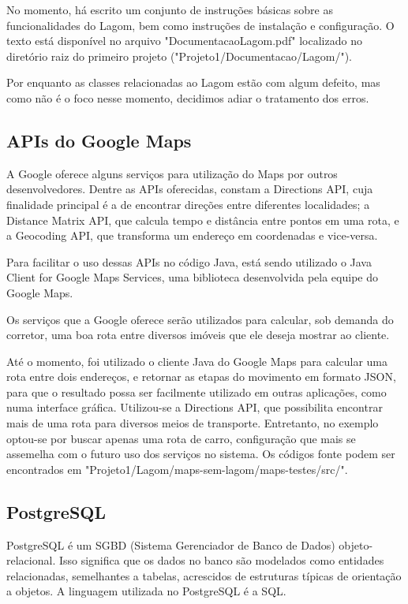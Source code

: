 \documentclass[a4paper,11pt,fleqn]{article}
\begin{document}
No momento, há escrito um conjunto de instruções básicas sobre as funcionalidades do Lagom, bem como instruções de instalação e configuração.
 O texto está disponível no arquivo "DocumentacaoLagom.pdf" localizado no diretório raiz do primeiro projeto ("Projeto1/Documentacao/Lagom/").

Por enquanto as classes relacionadas ao Lagom estão com algum defeito, mas como não é o foco nesse momento, decidimos adiar o tratamento dos erros.

\subsection{APIs do Google Maps}
\label{ss:maps}

A Google oferece alguns serviços para utilização do Maps por outros desenvolvedores. Dentre as APIs oferecidas, constam a Directions API,
 cuja finalidade principal é a de encontrar direções entre diferentes localidades; a Distance Matrix API, que calcula tempo e distância entre
  pontos em uma rota, e a Geocoding API, que transforma um endereço em coordenadas e vice-versa.

Para facilitar o uso dessas APIs no código Java, está sendo utilizado o Java Client for Google Maps Services, uma biblioteca desenvolvida pela equipe do
 Google Maps.

Os serviços que a Google oferece serão utilizados para calcular, sob demanda do corretor, uma boa rota entre diversos imóveis que ele deseja mostrar ao
 cliente.

 Até o momento, foi utilizado o cliente Java do Google Maps para calcular uma rota entre dois endereços, e retornar as etapas do movimento em formato
  JSON, para que o resultado possa ser facilmente utilizado em outras aplicações, como numa interface gráfica. Utilizou-se a Directions API, que possibilita
   encontrar mais de uma rota para diversos meios de transporte. Entretanto, no exemplo optou-se por buscar apenas uma rota de carro, configuração que mais se assemelha
    com o futuro uso dos serviços no sistema. Os códigos fonte podem ser encontrados em "Projeto1/Lagom/maps-sem-lagom/maps-testes/src/".

\subsection{PostgreSQL}
\label{ss:postgre}

PostgreSQL é um SGBD (Sistema Gerenciador de Banco de Dados) objeto-relacional. Isso significa que os dados no banco são modelados como entidades relacionadas, semelhantes
 a tabelas, acrescidos de estruturas típicas de orientação a objetos. A linguagem utilizada no PostgreSQL é a SQL.
\end{document}
